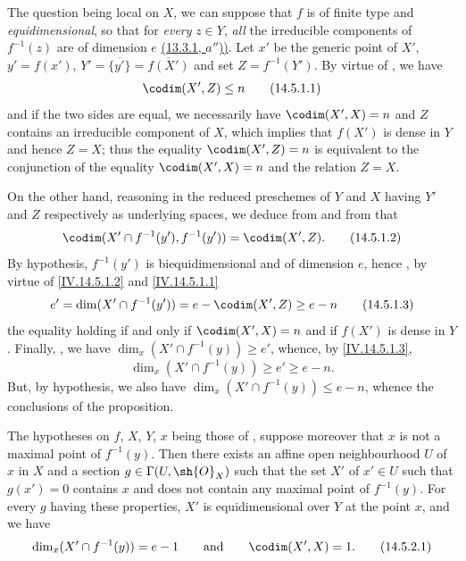 The question being local on $X$, we can suppose that $f$ is of finite type and \emph{equidimensional}, so that for \emph{every} $z\in Y$, \emph{all} the irreducible components of $f^{-1}(z)$ are of dimension $e$ {\hyperlink{ega4.c04.prop.13-3-1}{(13.3.1, $a''$))}}.
Let $x'$ be the generic point of $X'$, $y'=f(x')$, $Y'=\overline{\{y'\}}=\overline{f(X')}$ and set $Z=f^{-1}(Y')$.
By virtue of , we have
\begin{equation}
  \codim(X',Z)\leq n
  \tag{14.5.1.1}\label{IV.14.5.1.1}
\end{equation}
and if the two sides are equal, we necessarily have $\codim(X',X)=n$ and $Z$ contains an irreducible component of $X$, which implies  that $f(X')$ is dense in $Y$ and hence $Z=X$; thus the equality $\codim(X',Z)=n$ is equivalent to the conjunction of the equality $\codim(X',X)=n$ and the relation $Z=X$.

On the other hand, reasoning in the reduced preschemes of $Y$ and $X$ having $Y'$ and $Z$ respectively as underlying spaces, we deduce from  and from  that
\begin{equation}
  \codim(X'\cap f^{-1}(y'),f^{-1}(y'))=\codim(X',Z).
  \tag{14.5.1.2}\label{IV.14.5.1.2}
\end{equation}
By hypothesis, $f^{-1}(y')$ is biequidimensional  and of dimension $e$, hence , by virtue of \eqref{IV.14.5.1.2} and \eqref{IV.14.5.1.1}
\begin{equation}
  e'=\dim(X'\cap f^{-1}(y'))=e-\codim(X',Z)\geq e-n
  \tag{14.5.1.3}\label{IV.14.5.1.3}
\end{equation}
the equality holding if and only if $\codim(X',X)=n$ and if $f(X')$ is dense in $Y$.
Finally, , we have $\dim_x(X'\cap f^{-1}(y))\geq e'$, whence, by \eqref{IV.14.5.1.3},
\begin{equation}
  \dim_x(X'\cap f^{-1}(y))\geq e'\geq e-n.
  \tag{14.5.1.4}\label{IV.14.5.1.4}
\end{equation}
But, by hypothesis, we also have $\dim_x(X'\cap f^{-1}(y))\leq e-n$, whence the conclusions of the proposition.

\begin{corollary}[14.5.2]
\label{IV.14.5.2}
The hypotheses on $f$, $X$, $Y$, $x$ being those of , suppose moreover that $x$ is not a maximal point of $f^{-1}(y)$.
Then there exists an affine open neighbourhood $U$ of $x$ in $X$ and a section $g\in\Gamma(U,\sh{O}_X)$ such that the set $X'$ of $x'\in U$ such that $g(x')=0$ contains $x$ and does not contain any maximal point of $f^{-1}(y)$.
For every $g$ having these properties, $X'$ is equidimensional over $Y$ at the point $x$, and we have
\begin{equation}
  \dim_x(X'\cap f^{-1}(y))=e-1 \qquad\text{and}\qquad \codim(X',X)=1.
  \tag{14.5.2.1}\label{IV.14.5.2.1}
\end{equation}
\end{corollary}

